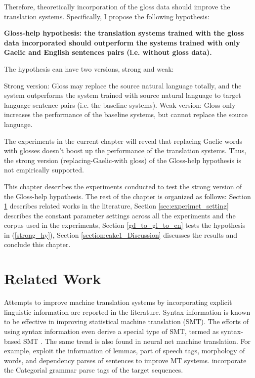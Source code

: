 \documentclass[final]{ua-thesis}
\numberwithin{equation}{section}
\begin{document}
Therefore, theoretically incorporation of the gloss data should improve the translation systems. Specifically, I propose the following hypothesis:
\begin{exe} 
\ex \label{gloss_helps_hypothesis}\textbf{Gloss-help hypothesis: the translation systems trained with the gloss data incorporated should outperform the systems trained with only Gaelic and English sentences pairs (i.e. without gloss data).}

The hypothesis can have two versions, strong and weak:
	\begin{xlist}
	\ex \label{strong_hy} Strong version: Gloss may replace the source natural language totally, and the system outperforms the system trained with source natural language to target language sentence pairs (i.e. the baseline systems).  
	\ex \label{weak_hy} Weak version: Gloss only increases the performance of the baseline systems, but cannot replace the source language.
	\end{xlist}
\end{exe}

The experiments in the current chapter will reveal that replacing Gaelic words with glosses doesn't boost up the performance of the translation systems. Thus, the strong version (replacing-Gaelic-with gloss) of the Gloss-help hypothesis is not empirically supported. 

This chapter describes the experiments conducted to test the strong version of the Gloss-help hypothesis.
The rest of the chapter is organized as follows: Section \ref{relate_work} describes related works in the literature, Section \ref{sec:experimet_setting} describes the constant parameter settings across all the experiments and the corpus used in the experiments, Section \ref{gd_to_gl_to_en} tests the hypothesis in (\ref{strong_hy}), Section \ref{section:cake1_Discussion} discusses the results and conclude this chapter.
\section{Related Work}\label{relate_work}
Attempts to improve machine translation systems by incorporating explicit linguistic information are reported in the literature. Syntax information is known to be effective in improving statistical machine translation (SMT). The efforts of using syntax information even derive a special type of SMT, termed as syntax-based SMT \citep{williams2016syntax}. The same trend is also found in neural net machine translation. For example, \citet{sennrich2016linguistic} exploit the information of lemmas, part of speech tags, morphology of words, and dependency parses of sentences to improve MT systems. \citet{ccg_target_seq} incorporate the Categorial grammar parse tags of the target sequences.
\end{document}
